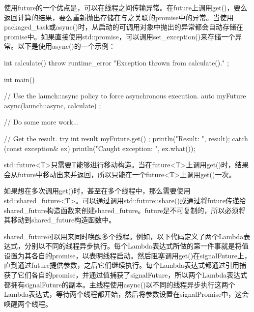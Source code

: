 
使用future的一个优点是，可以在线程之间传输异常。在future上调用get()，要么返回计算的结果，要么重新抛出存储在与之关联的promise中的异常。当使用packaged\_task或async()时，从启动的可调用对象中抛出的异常都会自动存储在promise中。如果直接使用std::promise，可以调用set\_exception()来存储一个异常。以下是使用async()的一个示例：

\begin{cpp}
int calculate()
{
    throw runtime_error { "Exception thrown from calculate()." };
}

int main()
{
    // Use the launch::async policy to force asynchronous execution.
    auto myFuture { async(launch::async, calculate) };

    // Do some more work...

    // Get the result.
    try {
        int result { myFuture.get() };
        println("Result: {}", result);
    } catch (const exception& ex) {
        println("Caught exception: {}", ex.what());
    }
}
\end{cpp}


std::future<T>只需要T能够进行移动构造。当在future<T>上调用get()时，结果会从future中移动出来并返回，所以只能在一个future<T>上调用get()一次。

如果想在多次调用get()时，甚至在多个线程中，那么需要使用std::shared\_future<T>。可以通过调用std::future::share()或通过将future传递给shared\_future构造函数来创建shared\_future。future是不可复制的，所以必须将其移动到shared\_future构造函数中。

shared\_future可以用来同时唤醒多个线程。例如，以下代码定义了两个Lambda表达式，分别以不同的线程异步执行。每个Lambda表达式所做的第一件事就是将值设置为其各自的promise，以表明线程启动。然后阻塞调用get()在signalFuture上，直到通过future提供参数，之后它们继续执行。每个Lambda表达式都通过引用捕获了它们各自的promise，并通过值捕获了signalFuture，所以两个Lambda表达式都拥有signalFuture的副本。主线程使用async()以不同的线程异步执行这两个Lambda表达式，等待两个线程都开始，然后将参数设置在signalPromise中，这会唤醒两个线程。

